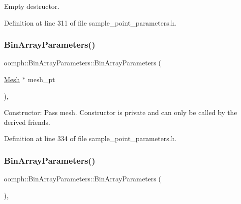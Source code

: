 Empty destructor. 



Definition at line 311 of file sample\+\_\+point\+\_\+parameters.\+h.

\mbox{\label{classoomph_1_1BinArrayParameters_ae2bfef88dd9025fc731b11a7dd8fcb1b}} 
\subsubsection{\texorpdfstring{Bin\+Array\+Parameters()}{BinArrayParameters()}\hspace{0.1cm}{\footnotesize\ttfamily [2/3]}}
{\footnotesize\ttfamily oomph\+::\+Bin\+Array\+Parameters\+::\+Bin\+Array\+Parameters (\begin{DoxyParamCaption}\item[{\hyperlink{classoomph_1_1Mesh}{Mesh} $\ast$}]{mesh\+\_\+pt }\end{DoxyParamCaption})\hspace{0.3cm}{\ttfamily [inline]}, {\ttfamily [private]}}



Constructor\+: Pass mesh. Constructor is private and can only be called by the derived friends. 



Definition at line 334 of file sample\+\_\+point\+\_\+parameters.\+h.

\mbox{\label{classoomph_1_1BinArrayParameters_a25db158eff522cb0ad014eecbfa0d106}} 
\subsubsection{\texorpdfstring{Bin\+Array\+Parameters()}{BinArrayParameters()}\hspace{0.1cm}{\footnotesize\ttfamily [3/3]}}
{\footnotesize\ttfamily oomph\+::\+Bin\+Array\+Parameters\+::\+Bin\+Array\+Parameters (\begin{DoxyParamCaption}{ }\end{DoxyParamCaption})\hspace{0.3cm}{\ttfamily [inline]}, {\ttfamily [private]}}



